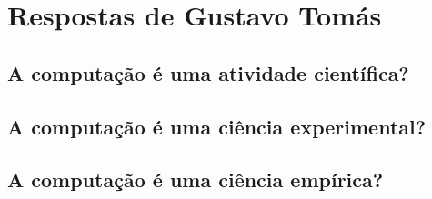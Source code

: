 \section{Respostas de Gustavo Tomás}

\subsection{A computação é uma atividade científica?}

\subsection{A computação é uma ciência experimental?}

\subsection{A computação é uma ciência empírica?}